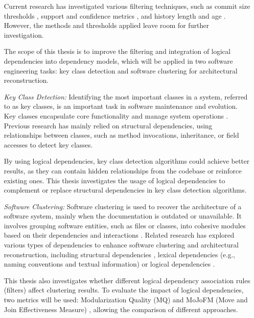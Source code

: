 Current research has investigated various filtering techniques, such as commit size thresholds \cite{Moonen-commit}, support and confidence metrics \cite{Zimmermann:2004:MVH:998675.999460}, and history length and age \cite{article-Moonen}. However, the methods and thresholds applied leave room for further investigation.

The scope of this thesis is to improve the filtering and integration of logical dependencies into dependency models, which will be applied in two software engineering tasks: key class detection and software clustering for architectural reconstruction.

\textit{Key Class Detection:} Identifying the most important classes in a system, referred to as key classes, is an important task in software maintenance and evolution. Key classes encapsulate core functionality and manage system operations \cite{ZaidmanJurnal}. Previous research has mainly relied on structural dependencies, using relationships between classes, such as method invocations, inheritance, or field accesses \cite{Finding-key-classes, ZaidmanJurnal} to detect key classes.

By using logical dependencies, key class detection algorithms could achieve better results, as they can contain hidden relationships from the codebase or reinforce existing ones. This thesis investigates the usage of logical dependencies to complement or replace structural dependencies in key class detection algorithms.

\textit{Software Clustering:} Software clustering is used to recover the architecture of a software system, mainly when the documentation is outdated or unavailable. It involves grouping software entities, such as files or classes, into cohesive modules based on their dependencies and interactions \cite{acdc, bunch, PagerankENASE}. Related research has explored various types of dependencies to enhance software clustering and architectural reconstruction, including structural dependencies \cite{bunch, PagerankENASE}, lexical dependencies (e.g., naming conventions and textual information) \cite{lexical-dep, corazza2} or logical dependencies \cite{b18}.

This thesis also investigates whether different logical dependency association rules (filters) affect clustering results. To evaluate the impact of logical dependencies, two metrics will be used: Modularization Quality (MQ) \cite{b10} and MoJoFM (Move and Join Effectiveness Measure) \cite{mojofm}, allowing the comparison of different approaches.





